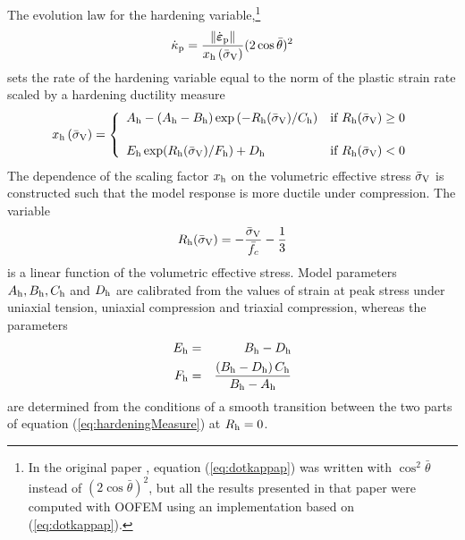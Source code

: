 \documentclass[a4paper]{article}
\newcommand{\mbf}[1]{\mbox{\boldmath$#1$}}
\newcommand{\veps}{\mbf{\varepsilon}}  %
\begin{document}
The evolution law for the hardening variable,\footnote{In the original paper \cite{GraJir},
equation (\ref{eq:dotkappap}) was written with $\cos^2\bar{\theta}$ instead of $(2\cos\bar{\theta})^2$,
but all the results presented in that paper were computed with OOFEM using an implementation based on (\ref{eq:dotkappap}).}
\begin{equation}\label{eq:dotkappap}
\dot{\kappa}_{\rm {p}} = \frac {\| \dot{\veps}_{\rm{p}}\|}{x_{\rm{h}}\left(\bar{\sigma}_{\rm V} \right)}(2\cos\bar{\theta})^2 
\end{equation}
sets the rate of the hardening variable equal to the norm of the plastic strain rate 
scaled by a hardening ductility measure 
\begin{equation} \label{eq:hardeningMeasure}
x_{\rm{h}}\left(\bar{\sigma}_{\rm V}\right) = \left\{ \begin{array}{ll}
A_{\rm{h}} - \left(A_{\rm{h}} - B_{\rm{h}} \right)\exp{\left(-R_{\rm h}(\bar{\sigma}_{\rm V})/C_{\rm h}\right)} & \mbox{if $R_{\rm h}(\bar{\sigma}_{\rm V}) \geq 0 $} \\[5mm]
E_{\rm h}\exp({R_{\rm h}(\bar{\sigma}_{\rm V})/F_{\rm h}})+D_{\rm h} & \mbox{if $R_{\rm h}(\bar{\sigma}_{\rm V}) < 0$}
\end{array}
\right.
\end{equation}
The dependence of the scaling factor
$x_{\rm{h}}$ on the volumetric effective stress $\bar{\sigma}_{\rm V}$ is constructed such that
the model response is more ductile under compression.
%
The variable 
\begin{equation}
R_{\rm h}(\bar{\sigma}_{\rm V}) = -\frac{\bar{\sigma}_{\rm V}}{\bar{f}_c}-\frac{1}{3}
\end{equation}
is a linear function of the volumetric effective stress.
%
Model parameters $A_{\rm h}, B_{\rm h}, C_{\rm h}$ and $D_{\rm h}$ are calibrated from the values of strain at peak stress under uniaxial tension, uniaxial compression and triaxial compression, whereas the parameters 
\begin{eqnarray}
E_{\rm h} &=& B_{\rm h} - D_{\rm h}
\\
F_{\rm h} &=& \frac{\left(B_{\rm h} -D_{\rm h}\right)C_{\rm h}}{B_{\rm h} - A_{\rm h}}
\end{eqnarray}
are determined from the conditions of a smooth transition between the two parts of equation (\ref{eq:hardeningMeasure}) at $R_{\rm h} = 0$.
\end{document}
